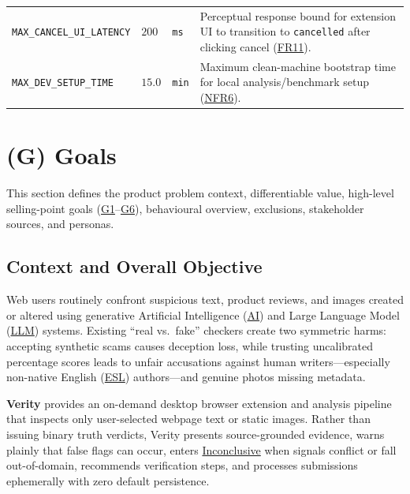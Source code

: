 \documentclass[11pt]{article}
\newcommand{\AI}{\hyperlink{acr-ai}{AI}}
\newcommand{\ESL}{\hyperlink{acr-esl}{ESL}}
\newcommand{\LLM}{\hyperlink{acr-llm}{LLM}}
\newcommand{\TermInconclusive}{\hyperlink{gls-inconclusive}{Inconclusive}}
\begin{document}
{\begin{tabularx}{\textwidth}{P{4.4cm} P{1.7cm} P{1.8cm} Y}
\addlinespace
{}\label{const:MAX_CANCEL_UI_LATENCY}\texttt{MAX\_\allowbreak{}CANCEL\_\allowbreak{}UI\_\allowbreak{}LATENCY} & $200$ & \texttt{ms} & Perceptual response bound for extension UI to transition to \texttt{cancelled} after clicking cancel (\hyperref[FR11]{FR11}).\\
\addlinespace
{}\label{const:MAX_DEV_SETUP_TIME}\texttt{MAX\_\allowbreak{}DEV\_\allowbreak{}SETUP\_\allowbreak{}TIME} & $15.0$ & \texttt{min} & Maximum clean-machine bootstrap time for local analysis/benchmark setup (\hyperref[NFR6]{NFR6}).\\
\end{tabularx}
}

\newpage
{}

\section*{(G) Goals}\label{sec:srs-goals}
\renewcommand{\thesubsection}{G.\arabic{subsection}}
\renewcommand{\theHsubsection}{G.\arabic{subsection}}
\setcounter{subsection}{0}

This section defines the product problem context, differentiable value, high-level selling-point goals (\hyperref[G1]{G1}--\hyperref[G6]{G6}), behavioural overview, exclusions, stakeholder sources, and personas.

\subsection{Context and Overall Objective}\label{subsec:context-objective}

Web users routinely confront suspicious text, product reviews, and images created or altered using generative Artificial Intelligence (\AI{}) and Large Language Model (\LLM{}) systems. Existing ``real vs.\ fake'' checkers create two symmetric harms: accepting synthetic scams causes deception loss, while trusting uncalibrated percentage scores leads to unfair accusations against human writers—especially non-native English (\ESL{}) authors—and genuine photos missing metadata.

\textbf{Verity} provides an on-demand desktop browser extension and analysis pipeline that inspects only user-selected webpage text or static images. Rather than issuing binary truth verdicts, Verity presents source-grounded evidence, warns plainly that false flags can occur, enters \TermInconclusive{} when signals conflict or fall out-of-domain, recommends verification steps, and processes submissions ephemerally with zero default persistence.
\end{document}

